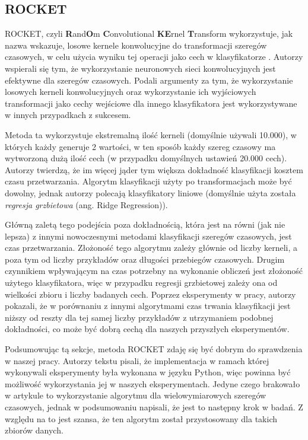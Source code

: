         \subsection{ROCKET}
            ROCKET, czyli \textbf{R}and\textbf{O}m \textbf{C}onvolutional \textbf{KE}rnel \textbf{T}ransform wykorzystuje, jak nazwa wskazuje, losowe kernele konwolucyjne do transformacji szeregów czasowych, w celu użycia wyniku tej operacji jako cech w klasyfikatorze \cite{Rocket_classifier}. Autorzy wspierali się tym, że wykorzystanie neuronowych sieci konwolucyjnych jest efektywne dla szeregów czasowych. Podali argumenty za tym, że wykorzystanie losowych kerneli konwolucyjnych oraz wykorzystanie ich wyjściowych transformacji jako cechy wejściowe dla innego klasyfikatora jest wykorzystywane w innych przypadkach z sukcesem. 
            
            Metoda ta wykorzystuje ekstremalną ilość kerneli (domyślnie używali 10.000), w których każdy generuje 2 wartości, w ten sposób każdy szereg czasowy ma wytworzoną dużą ilość cech (w przypadku domyślnych ustawień 20.000 cech). Autorzy twierdzą, że im więcej jąder tym większa dokładność klasyfikacji kosztem czasu przetwarzania. Algorytm klasyfikacji użyty po transformacjach może być dowolny, jednak autorzy polecają klasyfikatory liniowe (domyślnie użyta została \textit{regresja grzbietowa} (ang. Ridge Regression)).
            
            Główną zaletą tego podejścia poza dokładnością, która jest na równi (jak nie lepsza) z innymi nowoczesnymi metodami klasyfikacji szeregów czasowych, jest czas przetwarzania. Złożoność tego algorytmu zależy głównie od liczby kerneli, a poza tym od liczby przykładów oraz długości przebiegów czasowych. Drugim czynnikiem wpływającym na czas potrzebny na wykonanie obliczeń jest złożoność użytego klasyfikatora, więc w przypadku regresji grzbietowej zależy ona od wielkości zbioru i liczby badanych cech. Poprzez eksperymenty w pracy, autorzy pokazali, że w porównaniu z innymi algorytmami czas trwania klasyfikacji jest niższy od reszty dla tej samej liczby przykładów z utrzymaniem podobnej dokładności, co może być dobrą cechą dla naszych przyszłych eksperymentów.
            
            Podsumowując tą sekcje, metoda ROCKET zdaję się być dobrym do sprawdzenia w naszej pracy. Autorzy tekstu pisali, że implementacja w ramach której wykonywali eksperymenty była wykonana w języku Python, więc powinna być możliwość wykorzystania jej w naszych eksperymentach. Jedyne czego brakowało w artykule to wykorzystanie algorytmu dla wielowymiarowych szeregów czasowych, jednak w podsumowaniu napisali, że jest to następny krok w badań. Z względu na to jest szansa, że ten algorytm został przystosowany dla takich zbiorów danych.
